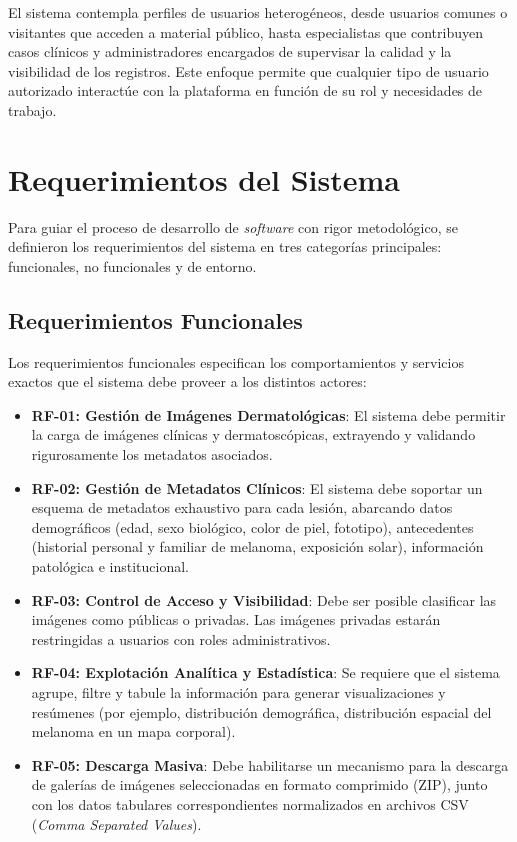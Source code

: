 El sistema contempla perfiles de usuarios heterogéneos, desde usuarios comunes o visitantes que acceden 
a material público, hasta especialistas que contribuyen casos clínicos y administradores encargados de 
supervisar la calidad y la visibilidad de los registros. Este enfoque permite que cualquier tipo de 
usuario autorizado interactúe con la plataforma en función de su rol y necesidades de trabajo.

\section{Requerimientos del Sistema}
Para guiar el proceso de desarrollo de \textit{software} con rigor metodológico, se definieron los requerimientos 
del sistema en tres categorías principales: funcionales, no funcionales y de entorno.

\subsection{Requerimientos Funcionales}
Los requerimientos funcionales especifican los comportamientos y servicios exactos que el sistema debe 
proveer a los distintos actores:

\begin{itemize}
    \item \textbf{RF-01: Gestión de Imágenes Dermatológicas}: El sistema debe permitir la carga de imágenes clínicas y dermatoscópicas, extrayendo y validando rigurosamente los 
    metadatos asociados.
    \item \textbf{RF-02: Gestión de Metadatos Clínicos}: El sistema debe soportar un esquema de metadatos 
    exhaustivo para cada lesión, abarcando datos demográficos (edad, sexo biológico, color de piel, fototipo), 
    antecedentes (historial personal y familiar de melanoma, exposición solar), información patológica e 
    institucional.
    \item \textbf{RF-03: Control de Acceso y Visibilidad}: Debe ser posible clasificar las imágenes como públicas 
    o privadas. Las imágenes privadas estarán restringidas a usuarios con roles administrativos.
    \item \textbf{RF-04: Explotación Analítica y Estadística}: Se requiere que el sistema agrupe, filtre y tabule 
    la información para generar visualizaciones y resúmenes (por ejemplo, distribución demográfica, 
    distribución espacial del melanoma en un mapa corporal).
    \item \textbf{RF-05: Descarga Masiva}: Debe habilitarse un mecanismo para la descarga de galerías de imágenes 
    seleccionadas en formato comprimido (ZIP), junto con los datos tabulares correspondientes normalizados 
    en archivos CSV (\textit{Comma Separated Values}).
\end{itemize}

